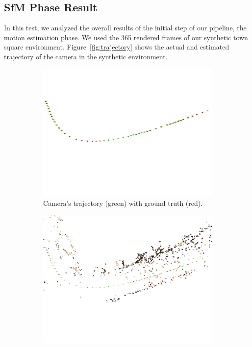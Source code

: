 \subsection{SfM Phase Result}
In this test, we analyzed the overall results of the initial step of our
pipeline, the motion estimation phase. We used the 365 rendered frames of our
synthetic town square environment. Figure~\ref{fig:trajectory} shows the actual
and estimated trajectory of the camera in the synthetic environment.
%
\begin{figure}[h]
\centering
\begin{subfigure}{0.45\linewidth}
\includegraphics[width=\linewidth]{img/snapshot00.png}
\caption{Camera's trajectory (green) with ground truth (red).}
\label{fig:trajectory1}
\end{subfigure}
\begin{subfigure}{0.45\linewidth}
\includegraphics[width=\linewidth]{img/snapshot01.png}

\end{subfigure}
\end{figure}
